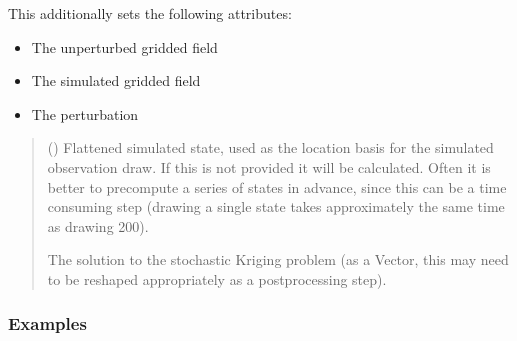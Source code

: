 \documentclass[letterpaper,10pt,english]{sphinxmanual}
\begin{document}
\begin{fulllineitems}
\begin{fulllineitems}
\sphinxAtStartPar
This additionally sets the following attributes:
\begin{itemize}
\item {}
\sphinxAtStartPar
{} \sphinxhyphen{} The unperturbed gridded field

\item {}
\sphinxAtStartPar
{} \sphinxhyphen{} The simulated gridded field

\item {}
\sphinxAtStartPar
{} \sphinxhyphen{} The perturbation

\end{itemize}
\begin{quote}\begin{description}
\sphinxAtStartPar
{} () \textendash{} Flattened simulated state, used as the location basis for the
simulated observation draw. If this is not provided it will be
calculated. Often it is better to pre\sphinxhyphen{}compute a series of states in
advance, since this can be a time consuming step (drawing a single
state takes approximately the same time as drawing 200).

\sphinxAtStartPar
The solution to the stochastic Kriging problem (as a Vector, this
may need to be re\sphinxhyphen{}shaped appropriately as a post\sphinxhyphen{}processing step).

\sphinxAtStartPar
{}

\end{description}\end{quote}
\subsubsection*{Examples}

\begin{sphinxVerbatim}[commandchars=\\\{\}]
  
  
\end{sphinxVerbatim}

\end{fulllineitems}


\end{fulllineitems}
\end{document}
